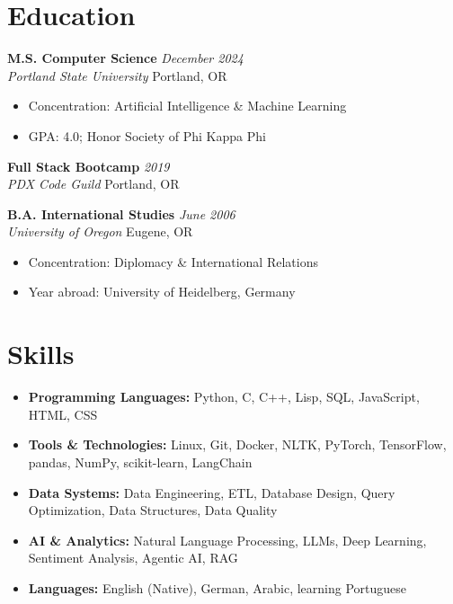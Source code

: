 \documentclass[letterpaper,11pt]{article}
\newcommand{\entry}[4]{
  \vspace{0.1em}
  \noindent\textbf{#1} \hfill \textit{#2}
  \\ \textit{#3} \hfill #4
  \vspace{0.3em}
}
\newcommand{\achievement}[1]{
  \vspace{-.5em}
  \item #1
}
\begin{document}
\section{Education}

\entry{M.S. Computer Science}{December 2024}{Portland State University}{Portland, OR}
\vspace{-.1cm}
\begin{itemize}[leftmargin=*]
  \achievement{Concentration: Artificial Intelligence \& Machine Learning}
  \achievement{GPA: 4.0; Honor Society of Phi Kappa Phi}
\end{itemize}

\entry{Full Stack Bootcamp}{2019}{PDX Code Guild}{Portland, OR}

\entry{B.A. International Studies}{June 2006}{University of Oregon}{Eugene, OR}
\vspace{-.1cm}
\begin{itemize}[leftmargin=*]
  \achievement{Concentration: Diplomacy \& International Relations}
  \achievement{Year abroad: University of Heidelberg, Germany}
\end{itemize}

\section{Skills}
\begin{itemize}[leftmargin=*, itemsep=-0.2em]
  \item \textbf{Programming Languages:} Python, C, C++, Lisp, SQL, JavaScript, HTML, CSS
  \item \textbf{Tools \& Technologies:} Linux, Git, Docker, NLTK, PyTorch, TensorFlow, pandas, NumPy, scikit-learn, LangChain
  \item \textbf{Data Systems:} Data Engineering, ETL, Database Design, Query Optimization, Data Structures, Data Quality
  \item \textbf{AI \& Analytics:} Natural Language Processing, LLMs, Deep Learning, Sentiment Analysis, Agentic AI, RAG
  \item \textbf{Languages:} English (Native), German, Arabic, learning Portuguese
\end{itemize}
 
\end{document}
